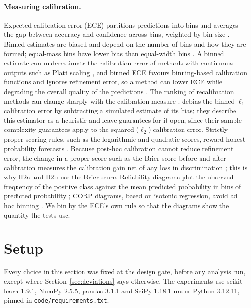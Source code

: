 \documentclass[11pt]{article}
\begin{document}
\paragraph{Measuring calibration.} Expected calibration error (ECE) partitions predictions
into bins and averages the gap between accuracy and confidence across bins, weighted by bin
size \citep{guo2017,naeini2015}. Binned estimates are biased and depend on the number of bins
and how they are formed; equal-mass bins have lower bias than equal-width bins
\citep{roelofs2022,nixon2019,kumar2019}. A binned estimate can underestimate the calibration
error of methods with continuous outputs such as Platt scaling \citep{kumar2019}, and binned
ECE favours binning-based calibration functions and ignores refinement error, so a method can
lower ECE while degrading the overall quality of the predictions \citep{berta2026}. The
ranking of recalibration methods can change sharply with the calibration measure
\citep{nixon2019}. \citet[Appendix~G, Def.~G.3]{kumar2019} debias the binned $\ell_1$
calibration error by subtracting a simulated estimate of its bias; they describe this
estimator as a heuristic and leave guarantees for it open, since their sample-complexity
guarantees apply to the squared ($\ell_2$) calibration error. Strictly proper scoring rules,
such as the logarithmic and quadratic scores, reward honest probability forecasts
\citep{gneiting2007}. Because post-hoc calibration cannot reduce refinement error,
the change in a proper score such as the Brier score before and after calibration measures the
calibration gain net of any loss in discrimination \citep{berta2026}; this is why H2a and H2b
use the Brier score. Reliability diagrams plot the observed frequency of the positive class
against the mean predicted probability in bins of predicted probability
\citep{degroot1983,niculescumizil2005}; CORP diagrams, based on isotonic regression, avoid
ad hoc binning \citep{dimitriadis2021}. We bin by the ECE's own rule so that the diagrams show
the quantity the tests use.

\section{Setup}
\label{sec:setup}

Every choice in this section was fixed at the design gate, before any analysis run, except
where Section~\ref{sec:deviations} says otherwise. The experiments use scikit-learn
\citep{pedregosa2011} 1.9.1, NumPy 2.5.5, pandas 3.1.1 and SciPy 1.18.1 under Python 3.12.11,
pinned in \texttt{code/requirements.txt}.
\end{document}
